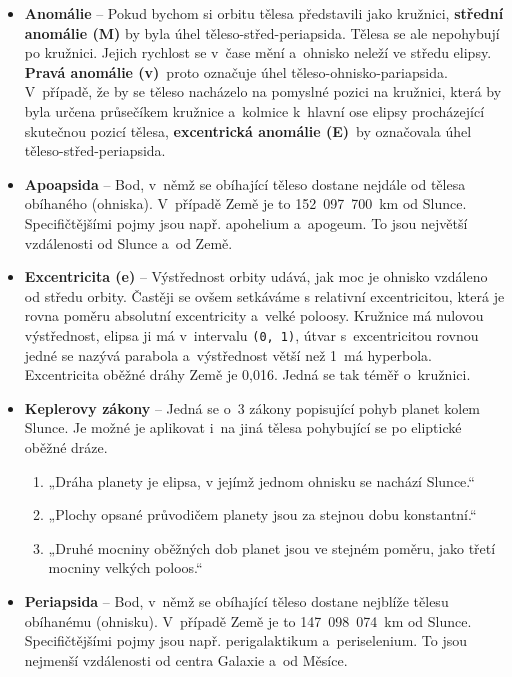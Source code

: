 \documentclass[a4paper,12pt]{article}
\def\code#1{\texttt{#1}}
\begin{document}
\begin{itemize}
\item \textbf{Anomálie} -- Pokud bychom si orbitu tělesa představili jako kružnici, \textbf{střední anomálie (M)} by byla úhel těleso-střed-periapsida. Tělesa se ale nepohybují po kružnici. Jejich rychlost se v~čase mění a~ohnisko neleží ve středu elipsy. \textbf{Pravá anomálie (v)}~proto označuje úhel těleso-ohnisko-pariapsida. V~případě, že by se těleso nacházelo na pomyslné pozici na kružnici, která by byla určena průsečíkem kružnice a~kolmice k~hlavní ose elipsy procházející skutečnou pozicí tělesa, \textbf{excentrická anomálie (E)}~by označovala úhel těleso-střed-periapsida.~\cite{kleczek}

\item \textbf{Apoapsida} -- Bod, v~němž se obíhající těleso dostane nejdále od tělesa obíhaného (ohniska). V~případě Země je to 152~097~700~km od Slunce. Specifičtějšími pojmy jsou např. apohelium a~apogeum. To jsou největší vzdálenosti od Slunce a~od Země.~\cite{kleczek}

\item \textbf{Excentricita (e)} -- Výstřednost orbity udává, jak moc je ohnisko vzdáleno od středu orbity. Častěji se ovšem setkáváme s relativní excentricitou, která je rovna poměru absolutní excentricity a~velké poloosy. Kružnice má nulovou výstřednost, elipsa ji má v~intervalu \code{(0,~1)}, útvar s~excentricitou rovnou jedné se nazývá parabola a~výstřednost větší než 1~má hyperbola. Excentricita oběžné dráhy Země je 0,016. Jedná se tak téměř o~kružnici.~\cite{kleczek}

\item \textbf{Keplerovy zákony} -- Jedná se o~3 zákony popisující pohyb planet kolem Slunce. Je možné je aplikovat i~na jiná tělesa pohybující se po eliptické oběžné dráze.~\cite{kleczek}

\begin{enumerate}
\item „Dráha planety je elipsa, v jejímž jednom ohnisku se nachází Slunce.“
\item „Plochy opsané průvodičem planety jsou za stejnou dobu konstantní.“
\item „Druhé mocniny oběžných dob planet jsou ve stejném poměru, jako třetí mocniny velkých poloos.“
\end{enumerate}

\item \textbf{Periapsida} -- Bod, v~němž se obíhající těleso dostane nejblíže tělesu obíhanému (ohnisku). V~případě Země je to 147~098~074~km od Slunce. Specifičtějšími pojmy jsou např. perigalaktikum a~periselenium. To jsou nejmenší vzdálenosti od centra Galaxie a~od Měsíce.~\cite{kleczek}


\end{itemize}
\end{document}
